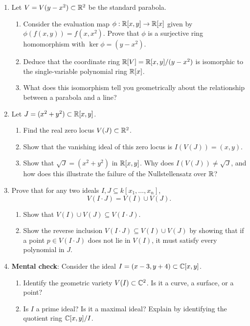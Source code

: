 \begin{enumerate}
  \item Let $V = V(y - x^2) \subset \mathbb{R}^2$ be the standard parabola.
  \begin{enumerate}
    \item Consider the evaluation map $\phi: \mathbb{R}[x, y] \to \mathbb{R}[x]$ given by $\phi(f(x, y)) = f(x, x^2)$. Prove that $\phi$ is a surjective ring homomorphism with $\ker \phi = (y - x^2)$.
    \item Deduce that the coordinate ring $\mathbb{R}[V] = \mathbb{R}[x, y]/(y - x^2)$ is isomorphic to the single-variable polynomial ring $\mathbb{R}[x]$.
    \item What does this isomorphism tell you geometrically about the relationship between a parabola and a line?
  \end{enumerate}
  \item Let $J = (x^2 + y^2) \subset \mathbb{R}[x, y]$.
  \begin{enumerate}
    \item Find the real zero locus $V(J) \subset \mathbb{R}^2$.
    \item Show that the vanishing ideal of this zero locus is $I(V(J)) = (x, y)$.
    \item Show that $\sqrt{J} = (x^2 + y^2)$ in $\mathbb{R}[x, y]$. Why does $I(V(J)) \neq \sqrt{J}$, and how does this illustrate the failure of the Nullstellensatz over $\mathbb{R}$?
  \end{enumerate}
  \item Prove that for any two ideals $I, J \subseteq k[x_1, \dots, x_n]$,
  \[
  V(I \cdot J) = V(I) \cup V(J).
  \]
  \begin{enumerate}
    \item Show that $V(I) \cup V(J) \subseteq V(I \cdot J)$.
    \item Show the reverse inclusion $V(I \cdot J) \subseteq V(I) \cup V(J)$ by showing that if a point $p \in V(I \cdot J)$ does not lie in $V(I)$, it must satisfy every polynomial in $J$.
  \end{enumerate}
  \item \textbf{Mental check}: Consider the ideal $I = (x - 3, y + 4) \subset \mathbb{C}[x, y]$.
  \begin{enumerate}
    \item Identify the geometric variety $V(I) \subset \mathbb{C}^2$. Is it a curve, a surface, or a point?
    \item Is $I$ a prime ideal? Is it a maximal ideal? Explain by identifying the quotient ring $\mathbb{C}[x, y]/I$.
  \end{enumerate}

\end{enumerate}
